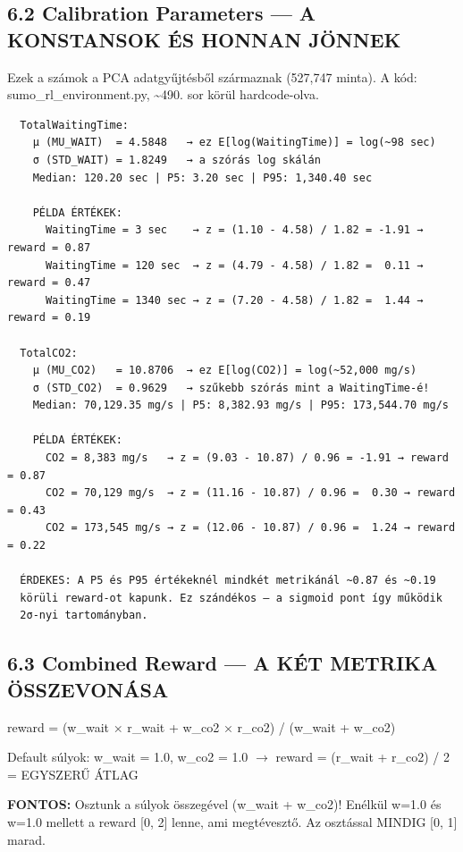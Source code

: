 \documentclass[11pt,a4paper]{article}
\begin{document}
\subsection*{6.2 Calibration Parameters — A KONSTANSOK ÉS HONNAN JÖNNEK}
Ezek a számok a PCA adatgyűjtésből származnak (527,747 minta).
A kód: sumo\_rl\_environment.py, \textasciitilde{}490. sor körül hardcode-olva.

\vspace{1em}\begin{verbatim}
  TotalWaitingTime:
    μ (MU_WAIT)  = 4.5848   → ez E[log(WaitingTime)] = log(~98 sec)
    σ (STD_WAIT) = 1.8249   → a szórás log skálán
    Median: 120.20 sec | P5: 3.20 sec | P95: 1,340.40 sec

    PÉLDA ÉRTÉKEK:
      WaitingTime = 3 sec    → z = (1.10 - 4.58) / 1.82 = -1.91 → reward = 0.87
      WaitingTime = 120 sec  → z = (4.79 - 4.58) / 1.82 =  0.11 → reward = 0.47
      WaitingTime = 1340 sec → z = (7.20 - 4.58) / 1.82 =  1.44 → reward = 0.19

  TotalCO2:
    μ (MU_CO2)   = 10.8706  → ez E[log(CO2)] = log(~52,000 mg/s)
    σ (STD_CO2)  = 0.9629   → szűkebb szórás mint a WaitingTime-é!
    Median: 70,129.35 mg/s | P5: 8,382.93 mg/s | P95: 173,544.70 mg/s

    PÉLDA ÉRTÉKEK:
      CO2 = 8,383 mg/s   → z = (9.03 - 10.87) / 0.96 = -1.91 → reward = 0.87
      CO2 = 70,129 mg/s  → z = (11.16 - 10.87) / 0.96 =  0.30 → reward = 0.43
      CO2 = 173,545 mg/s → z = (12.06 - 10.87) / 0.96 =  1.24 → reward = 0.22

  ÉRDEKES: A P5 és P95 értékeknél mindkét metrikánál ~0.87 és ~0.19
  körüli reward-ot kapunk. Ez szándékos — a sigmoid pont így működik
  2σ-nyi tartományban.

\end{verbatim}
\subsection*{6.3 Combined Reward — A KÉT METRIKA ÖSSZEVONÁSA}
reward = (w\_wait × r\_wait + w\_co2 × r\_co2) / (w\_wait + w\_co2)

Default súlyok: w\_wait = 1.0, w\_co2 = 1.0
$\rightarrow$ reward = (r\_wait + r\_co2) / 2 = EGYSZERŰ ÁTLAG

\textbf{FONTOS:} Osztunk a súlyok összegével (w\_wait + w\_co2)!
Enélkül w=1.0 és w=1.0 mellett a reward [0, 2] lenne, ami
megtévesztő. Az osztással MINDIG [0, 1] marad.
\end{document}
